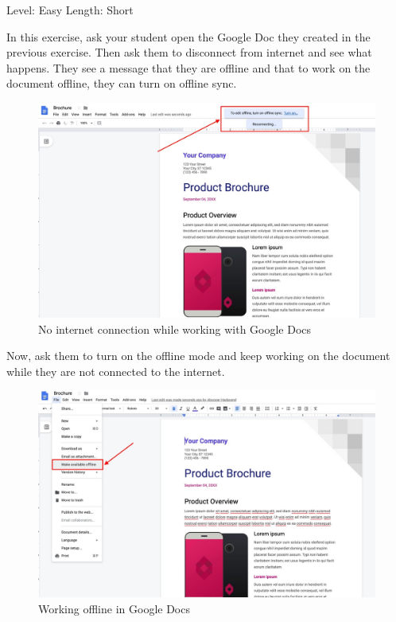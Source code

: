 \documentclass[]{book}
\begin{document}
Level: Easy
Length: Short

In this exercise, ask your student open the Google Doc they created in the previous exercise. Then ask them to disconnect from internet and see what happens. They see a message that they are offline and that to work on the document offline, they can turn on offline sync.

\begin{figure}
\centering
\includegraphics{./images/gdoc_no_internet.jpg}
\caption{No internet connection while working with Google Docs}
\end{figure}

Now, ask them to turn on the offline mode and keep working on the document while they are not connected to the internet.

\begin{figure}
\centering
\includegraphics{./images/gdoc_work_offline.jpg}
\caption{Working offline in Google Docs}
\end{figure}
\end{document}
